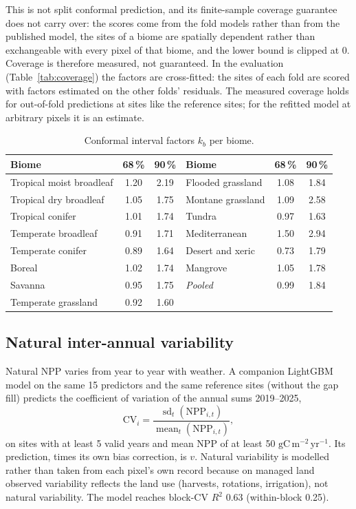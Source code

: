 \documentclass[11pt,a4paper]{article}
\newcommand{\npp}{\ensuremath{\mathrm{gC\,m^{-2}\,yr^{-1}}}}
\begin{document}
This is not split conformal prediction, and its finite-sample coverage guarantee does not carry
over: the scores come from the fold models rather than from the published model, the sites of a
biome are spatially dependent rather than exchangeable with every pixel of that biome, and the
lower bound is clipped at 0. Coverage is therefore measured, not guaranteed. In the evaluation
(Table~\ref{tab:coverage}) the factors are cross-fitted: the sites of each fold are scored with
factors estimated on the other folds' residuals. The measured coverage holds for out-of-fold
predictions at sites like the reference sites; for the refitted model at arbitrary pixels it is an
estimate.

\begin{table}[H]
\centering\small
\caption{Conformal interval factors $k_b$ per biome.}
\label{tab:kb}
\begin{tabular}{lcc|lcc}
\toprule
Biome & 68\,\% & 90\,\% & Biome & 68\,\% & 90\,\% \\
\midrule
Tropical moist broadleaf & 1.20 & 2.19 & Flooded grassland & 1.08 & 1.84 \\
Tropical dry broadleaf & 1.05 & 1.75 & Montane grassland & 1.09 & 2.58 \\
Tropical conifer & 1.01 & 1.74 & Tundra & 0.97 & 1.63 \\
Temperate broadleaf & 0.91 & 1.71 & Mediterranean & 1.50 & 2.94 \\
Temperate conifer & 0.89 & 1.64 & Desert and xeric & 0.73 & 1.79 \\
Boreal & 1.02 & 1.74 & Mangrove & 1.05 & 1.78 \\
Savanna & 0.95 & 1.75 & \textit{Pooled} & 0.99 & 1.84 \\
Temperate grassland & 0.92 & 1.60 & & & \\
\bottomrule
\end{tabular}
\end{table}

\subsection{Natural inter-annual variability}

Natural NPP varies from year to year with weather. A companion LightGBM model on the same 15
predictors and the same reference sites (without the gap fill) predicts the coefficient of
variation of the annual sums 2019--2025,
\begin{equation}
\mathrm{CV}_i = \frac{\operatorname{sd}_t(\mathrm{NPP}_{i,t})}{\operatorname{mean}_t(\mathrm{NPP}_{i,t})},
\end{equation}
on sites with at least 5 valid years and mean NPP of at least 50 \npp. Its prediction, times its
own bias correction, is $v$. Natural variability is modelled rather than taken from each pixel's
own record because on managed land observed variability reflects the land use (harvests,
rotations, irrigation), not natural variability. The model reaches block-CV $R^2$ 0.63
(within-block 0.25).
\end{document}
